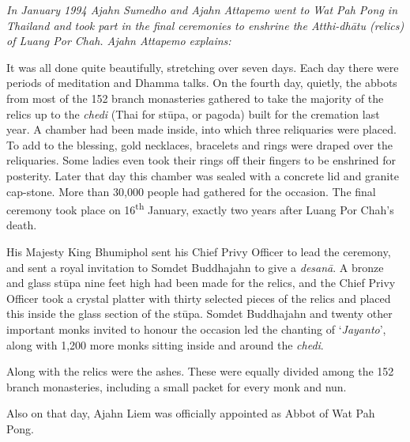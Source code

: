 
\emph{In January 1994 Ajahn Sumedho and Ajahn Attapemo went to Wat Pah
Pong in Thailand and took part in the final ceremonies to enshrine the
Atthi-dhātu (relics) of Luang Por Chah. Ajahn Attapemo explains:}

It was all done quite beautifully, stretching over seven days. Each day
there were periods of meditation and Dhamma talks. On the fourth day, 
quietly, the abbots from most of the 152 branch monasteries gathered to
take the majority of the relics up to the \emph{chedi} (Thai for stūpa, or
pagoda) built for the cremation last year. A chamber had been made
inside, into which three reliquaries were placed. To add to the
blessing, gold necklaces, bracelets and rings were draped over the
reliquaries. Some ladies even took their rings off their fingers to be
enshrined for posterity. Later that day this chamber was sealed with a
concrete lid and granite cap-stone. More than 30,000 people had gathered
for the occasion. The final ceremony took place on 16\textsuperscript{th} January, exactly
two years after Luang Por Chah's death. 

His Majesty King Bhumiphol sent his Chief Privy Officer to lead the
ceremony, and sent a royal invitation to Somdet Buddhajahn to give a
\emph{desanā}. A bronze and glass stūpa nine feet high had been made for
the relics, and the Chief Privy Officer took a crystal platter with
thirty selected pieces of the relics and placed this inside the glass
section of the stūpa. Somdet Buddhajahn and twenty other important monks
invited to honour the occasion led the chanting of `\emph{Jayanto}', along
with 1,200 more monks sitting inside and around the \emph{chedi}.

Along with the relics were the ashes. These were equally divided among
the 152 branch monasteries, including a small packet for every monk and
nun.

Also on that day, Ajahn Liem was officially appointed as Abbot of Wat
Pah Pong.

